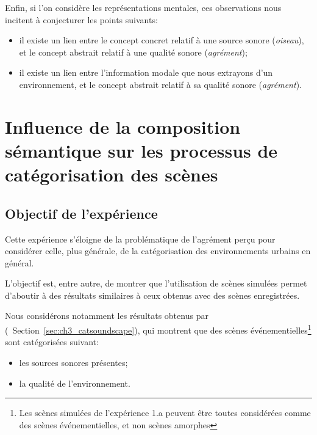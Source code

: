 Enfin, si l'on considère les représentations mentales, ces observations nous incitent à conjecturer les points suivants:
 
\begin{itemize}
\item  il existe un lien entre le concept concret relatif à une source sonore (\emph{oiseau}), et le concept abstrait relatif à une qualité sonore (\emph{agrément});
\item  il existe un lien entre l'information modale que nous extrayons d'un environnement, et le concept abstrait relatif à sa qualité sonore (\emph{agrément}).
\end{itemize}

\section[Composition sémantique et catégorisation]{Influence de la composition sémantique sur les processus de catégorisation des scènes}
\label{sec:xp4}

\subsection{Objectif de l'expérience}
\label{sec:ch5_objXp3}

Cette expérience s'éloigne de la problématique de l'agrément perçu pour considérer celle, plus générale, de la catégorisation des environnements urbains en général. 

L'objectif est, entre autre, de montrer que l’utilisation de scènes simulées permet d'aboutir à des résultats similaires à ceux obtenus avec des scènes enregistrées.

Nous considérons notamment les résultats obtenus par \citep{maffiolo_caracterisation_1999} (\cf~Section~\ref{sec:ch3_catsoundscape}), qui montrent que des scènes événementielles\footnote{Les scènes simulées de l'expérience 1.a peuvent être toutes considérées comme des scènes événementielles, et non scènes amorphes} sont catégorisées suivant:

\begin{itemize}
\item les sources sonores présentes;
\item la qualité de l'environnement.
\end{itemize}

